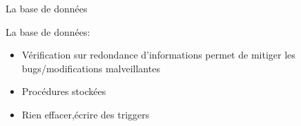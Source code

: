 \begin{frame}{La base de données}

 La base de données:
  \begin{itemize}
  \item Vérification sur redondance d'informations permet de mitiger les bugs/modifications malveillantes
  \item Procédures stockées
  \item Rien effacer,écrire des triggers
  \end{itemize}
\end{frame}